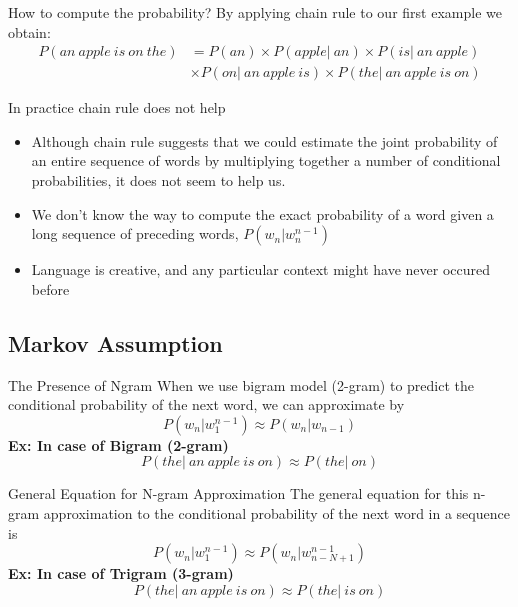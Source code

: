 \documentclass{beamer}
\begin{document}
\begin{frame}{How to compute the probability?}
By applying chain rule to our first example we obtain:
    \begin{align*}
        P(an\ apple\ is\ on\ the) &= P(an)\times P(apple|\ an) \times P(is|\ an\ apple)\\
                                  &\times P(on|\ an\ apple\ is) \times P(the|\ an\ apple\ is\ on) 
    \end{align*}
\end{frame}

\begin{frame}{In practice chain rule does not help}
    \begin{itemize}
        \item Although chain rule suggests that we could estimate the joint probability of an entire sequence of words by multiplying together a number of conditional probabilities, it does not seem to help us.
        \item We don't know the way to compute the exact probability of a word given a long sequence of preceding words, $P(w_n|w_n^{n-1})$
        \item Language is creative, and any particular context might have never occured before
    \end{itemize}
\end{frame}
\subsection{Markov Assumption}

\begin{frame}{The Presence of Ngram}
    When we use bigram model (2-gram) to predict the conditional probability of the next word,
    we can approximate by
    $$P(w_n|w_1^{n-1}) \approx P(w_n|w_{n-1})$$
    \textbf{Ex: In case of Bigram (2-gram)} 
    $$P(the|\ an\ apple\ is\ on) \approx P(the|\ on)$$
\end{frame}


\begin{frame}{General Equation for N-gram Approximation}
    The general equation for this n-gram approximation to the conditional probability of the next word in a sequence is
    $$P(w_n|w_1^{n-1}) \approx P(w_n|w_{n-N+1}^{n-1})$$
    \textbf{Ex: In case of Trigram (3-gram)} 
    $$P(the|\ an\ apple\ is\ on) \approx P(the|\ is\ on)$$
\end{frame}
\end{document}
